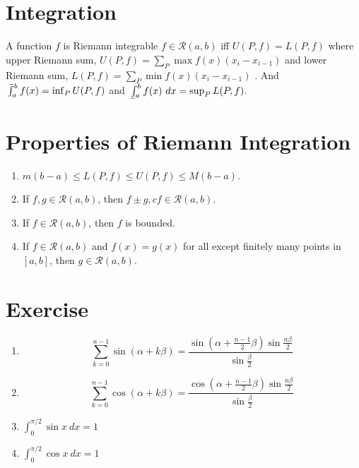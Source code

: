 \def\upint{\mathchoice%
    {\mkern13mu\overline{\vphantom{\intop}\mkern7mu}\mkern-20mu}%
    {\mkern7mu\overline{\vphantom{\intop}\mkern7mu}\mkern-14mu}%
    {\mkern7mu\overline{\vphantom{\intop}\mkern7mu}\mkern-14mu}%
    {\mkern7mu\overline{\vphantom{\intop}\mkern7mu}\mkern-14mu}%
  \int}
\def\lowint{\mkern3mu\underline{\vphantom{\intop}\mkern7mu}\mkern-10mu\int}
\section{Integration}
\begin{definition}
	A function $f$ is Riemann integrable $f \in \mathscr{R}(a,b)$ iff $U(P,f) = L(P,f)$ where upper Riemann sum, $U(P,f) = \sum_P \max f(x)(x_i-x_{i-1})$ and lower Riemann sum, $L(P,f) = \sum_P \min f(x)(x_i-x_{i-1})$ . And $\upint_a^b f(x) = \inf_P U(P,f)$ and $\lowint_a^b f(x)\ dx = \sup_P L(P,f)$.
\end{definition}

\section{Properties of Riemann Integration}
\begin{enumerate}
	\item $m(b-a) \le L(P,f) \le U(P,f) \le M(b-a)$.
	\item If $f,g \in \mathscr{R}(a,b)$, then $f \pm g, cf \in \mathscr{R}(a,b)$.
	\item If $f \in \mathscr{R}(a,b)$, then $f$ is bounded.
	\item If $f \in \mathscr{R}(a,b)$ and $f(x) = g(x)$ for all except finitely many points in $[a,b]$, then $g \in \mathscr{R}(a,b)$.
\end{enumerate}

\section{Exercise}
\begin{enumerate}
	\item $$\sum_{k=0}^{n-1} \sin (\alpha+k\beta) = \frac{\sin (\alpha + \frac{n-1}{2}\beta) \sin \frac{n\beta}{2}}{\sin \frac{\beta}{2}}$$
	\item $$\sum_{k=0}^{n-1} \cos (\alpha+k\beta) = \frac{\cos (\alpha + \frac{n-1}{2}\beta) \sin \frac{n\beta}{2}}{\sin \frac{\beta}{2}}$$
	\item $\int_0^{\pi/2} \sin x\ dx = 1$
	\item $\int_0^{\pi/2} \cos x\ dx = 1$
\end{enumerate}
